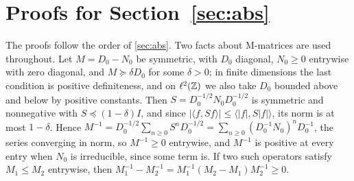 \section{Proofs for \texorpdfstring{Section~\ref{sec:abs}}{abstract collectives}}\label{app:abs}

The proofs follow the order of \cref{sec:abs}. Two facts about M-matrices are used throughout. Let $M=D_0-N_0$ be symmetric, with $D_0$ diagonal, $N_0\ge0$ entrywise with zero diagonal, and $M\succeq\delta D_0$ for some $\delta>0$; in finite dimensions the last condition is positive definiteness, and on $\ell^2(\mathbb{Z})$ we also take $D_0$ bounded above and below by positive constants. Then $S=D_0^{-1/2}N_0D_0^{-1/2}$ is symmetric and nonnegative with $S\preceq(1-\delta)I$, and since $\lvert\langle f,Sf\rangle\rvert\le\langle\lvert f\rvert,S\lvert f\rvert\rangle$, its norm is at most $1-\delta$. Hence $M^{-1}=D_0^{-1/2}\sum_{n\ge0}S^nD_0^{-1/2}=\sum_{n\ge0}(D_0^{-1}N_0)^nD_0^{-1}$, the series converging in norm, so $M^{-1}\ge0$ entrywise, and $M^{-1}$ is positive at every entry when $N_0$ is irreducible, since some term is. If two such operators satisfy $M_1\le M_2$ entrywise, then $M_1^{-1}-M_2^{-1}=M_1^{-1}(M_2-M_1)M_2^{-1}\ge0$.

